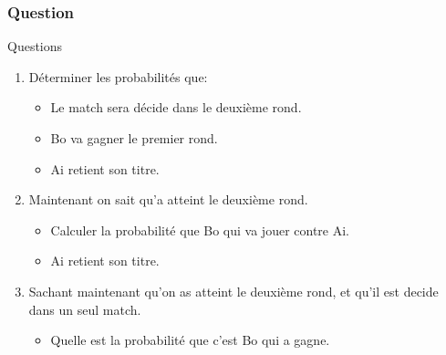 \documentclass{beamer}
\begin{document}
\begin{frame}[t]
  \frametitle{Question}
  \begin{block}{Questions}
\small
 \begin{enumerate}
   \item Déterminer les probabilités que:
     \begin{itemize}
       \item Le match sera décide dans le deuxième rond.
       \item  Bo va gagner le premier rond.
       \item Ai retient son titre.
     \end{itemize}
    \item Maintenant on sait qu'a atteint le deuxième rond.
      \begin{itemize}
        \item Calculer la probabilité que Bo qui va jouer contre Ai.
        \item Ai retient son titre.
      \end{itemize}
    \item Sachant maintenant qu'on as atteint le deuxième rond, et qu'il est
      decide dans un seul match.
      \begin{itemize}
        \item Quelle est la probabilité que c'est Bo qui a gagne.
      \end{itemize}
 \end{enumerate}   
  \end{block}
\end{frame}
\end{document}
